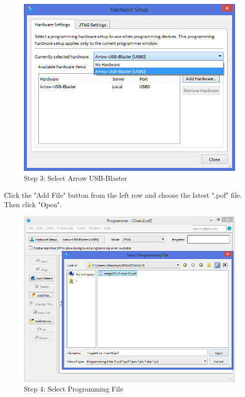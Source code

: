 \begin{figure}
  \includegraphics[width=\linewidth]{images/max10_03.png}
  \caption{Step 3: Select Arrow USB-Blaster}
  \label{fig:max10_03}
\end{figure}

Click the "Add File" button from the left row and choose the latest ".pof" file. Then click "Open".

\begin{figure}
  \includegraphics[width=\linewidth]{images/max10_04.png}
  \caption{Step 4: Select Programming File}
  \label{fig:max10_04}
\end{figure}

